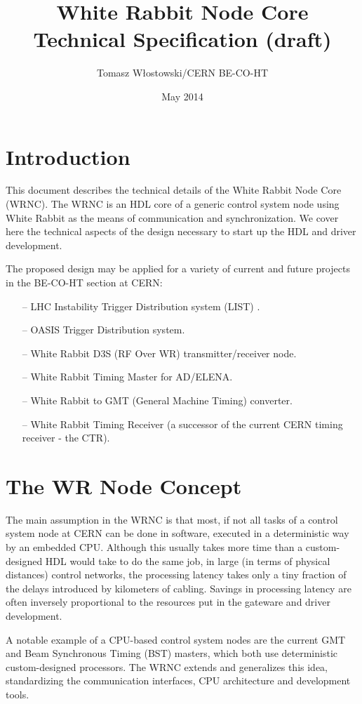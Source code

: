 \documentclass{article}
\title{White Rabbit Node Core\\Technical Specification (draft)}
\author{Tomasz Włostowski/CERN BE-CO-HT}
\date{May 2014}
\begin{document}
   \maketitle

\newcommand{\code}{\texttt}

\section{Introduction}
This document describes the technical details of the White Rabbit Node Core (WRNC). The WRNC is an HDL core 
of a generic control system node using White Rabbit as the means of communication and synchronization. 
We cover here the technical aspects of the design necessary to start up the HDL and driver development.

The proposed design  may be applied for a variety of current and future projects in the BE-CO-HT section at CERN:
\begin{itemize}
\item[--] LHC Instability Trigger Distribution system (LIST) \cite{list}.
\item[--] OASIS Trigger Distribution system.
\item[--] White Rabbit D3S (RF Over WR) transmitter/receiver node.
\item[--] White Rabbit Timing Master for AD/ELENA.
\item[--] White Rabbit to GMT (General Machine Timing) converter.
\item[--] White Rabbit Timing Receiver (a successor of the current CERN timing receiver - the CTR).
\end{itemize}

\section{The WR Node Concept}

The main assumption in the WRNC is that most, if not all tasks 
of a control system node at CERN can be done in software, executed 
in a deterministic way by an embedded CPU. Although this usually 
takes more time than a custom-designed HDL would take to do the same job, 
in large (in terms of physical distances) control networks, the processing 
latency takes only a tiny fraction of the delays introduced by kilometers 
of cabling. Savings in processing latency are often inversely proportional
to the resources put in the gateware and driver development.

A notable example of a CPU-based control system nodes are the current 
GMT and Beam Synchronous Timing (BST) masters, which both use deterministic custom-designed processors. 
The WRNC extends and generalizes this idea, standardizing the 
communication interfaces, CPU architecture and development tools.
\end{document}
